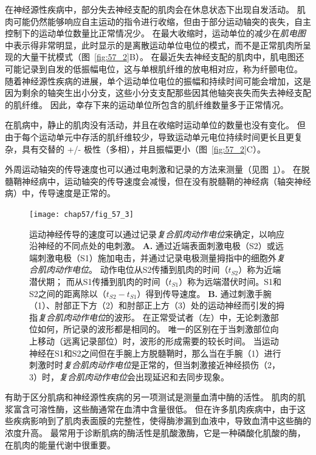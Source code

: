 在神经源性疾病中，部分失去神经支配的肌肉会在休息状态下出现自发活动。
肌肉可能仍然能够响应自主运动的指令进行收缩，但由于部分运动轴突的丧失，自主控制下的运动单位数量比正常情况少。
在最大收缩时，运动单位的减少在\textit{肌电图}中表示得非常明显，此时显示的是离散运动单位电位的模式，而不是正常肌肉所呈现的大量干扰模式（图~\ref{fig:57_2}B）。
在最近失去神经支配的肌肉中，肌电图还可能记录到自发的低振幅电位，这与单根肌纤维的放电相对应，称为纤颤电位。
随着神经源性疾病的进展，单个运动单位电位的振幅和持续时间可能会增加，这是因为剩余的轴突生出小分支，这些小分支支配那些因其他轴突丧失而失去神经支配的肌纤维。
因此，幸存下来的运动单位所包含的肌纤维数量多于正常情况。


在肌病中，静止的肌肉没有活动，并且在收缩时运动单位的数量也没有变化。
但由于每个运动单元中存活的肌纤维较少，导致运动单元电位持续时间更长且更复杂，具有交替的 +/- 极性（多相），并且振幅更小（图~\ref{fig:57_2}C）。


外周运动轴突的传导速度也可以通过电刺激和记录的方法来测量（见图~\ref{fig:57_3}）。
在脱髓鞘神经病中，运动轴突的传导速度会减慢，但在没有脱髓鞘的神经病（轴突神经病）中，传导速度是正常的。


\begin{figure}[htbp]
	\centering
	\texttt{[image: chap57/fig\_57\_3]}
	\caption{运动神经传导的速度可以通过记录\textit{复合肌肉动作电位}来确定，以响应沿神经的不同点处的电刺激。
		\textbf{A.} 通过近端表面刺激电极（S2）或远端刺激电极（S1）施加电击，并通过记录电极测量拇指中的细胞外\textit{复合肌肉动作电位}。
		动作电位从S2传播到肌肉的时间（$ t_{S2} $）称为近端潜伏期；
		而从S1传播到肌肉的时间（$ t_{S1} $）称为远端潜伏时间。S1和S2之间的距离除以（$ t_{S2} - t_{S1} $）得到传导速度。
		\textbf{B.} 通过刺激手腕（1）、肘部正下方（2）和肘部正上方（3）处的运动神经而引发的拇指\textit{复合肌肉动作电位}的波形。
		在正常受试者（左）中，无论刺激部位如何，所记录的波形都是相同的。
		唯一的区别在于当刺激部位向上移动（远离记录部位）时，波形的形成需要的较长时间。
		当运动神经在S1和S2之间但在手腕上方脱髓鞘时，那么当在手腕（1）进行刺激时时\textit{复合肌肉动作电位}是正常的，但当刺激接近神经损伤（2，3）时，\textit{复合肌肉动作电位}会出现延迟和去同步现象\cite{bromberg2002acute}。}
	\label{fig:57_3}
\end{figure}


有助于区分肌病和神经源性疾病的另一项测试是测量血清中酶的活性。
肌肉的肌浆富含可溶性酶，这些酶通常在血清中含量很低。
但在许多肌肉疾病中，由于这些疾病影响到了肌肉表面膜的完整性，使得酶渗漏到血液中，导致血清中这些酶的浓度升高。
最常用于诊断肌病的酶活性是肌酸激酶，它是一种磷酸化肌酸的酶，在肌肉的能量代谢中很重要。


